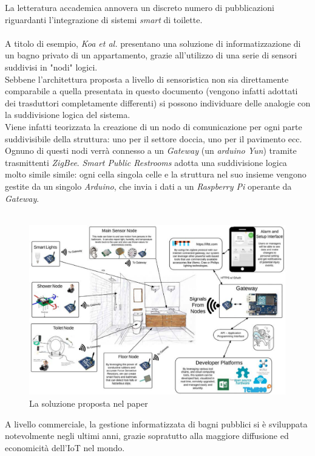 \documentclass[12pt]{article}
\begin{document}
La letteratura accademica annovera un discreto numero di pubblicazioni riguardanti l'integrazione di sistemi  \textit{smart} di toilette.\\\\
A titolo di esempio, \textit{Koa et al.}\cite{KooBathroom} presentano una soluzione di informatizzazione di un bagno privato di un appartamento, grazie all'utilizzo di una serie di sensori suddivisi in "nodi" logici.\\
Sebbene l'architettura proposta a livello di sensoristica non sia direttamente comparabile a quella presentata in questo documento (vengono infatti adottati dei trasduttori completamente differenti) si possono individuare delle analogie con la suddivisione logica del sistema.\\
Viene infatti teorizzata la creazione di un nodo di comunicazione per ogni parte suddivisibile della struttura: uno per il settore doccia, uno per il pavimento ecc.
Ognuno di questi nodi verrà connesso a un \textit{Gateway} (un \textit{arduino Yun}) tramite trasmittenti \textit{ZigBee}.
\textit{Smart Public Restrooms} adotta una suddivisione logica molto simile simile: ogni cella singola celle e la struttura nel suo insieme vengono gestite da un singolo \textit{Arduino}, che invia i dati a un \textit{Raspberry Pi} operante da \textit{Gateway}.\\\\
\begin{figure}[h!]
  \includegraphics[scale=0.35]{img/paperbathroom.png}
  \caption{La soluzione proposta nel paper}
  \label{fig:usecase_manager}
\end{figure}
\newpage
A livello commerciale, la gestione informatizzata di bagni pubblici si è sviluppata notevolmente negli ultimi anni, grazie sopratutto alla maggiore diffusione ed economicità dell'IoT nel mondo.\\
\end{document}
